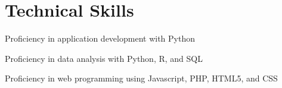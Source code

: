 \documentclass[letterpaper]{article}
\renewenvironment{itemize}{
  \begin{list}{}{
    \setlength{\leftmargin}{1.5em}
  }
}{
  \end{list}
}
\begin{document}
\section*{Technical Skills}

\begin{itemize}
    \item Proficiency in application development with Python
    \item Proficiency in data analysis with Python, R, and SQL
    \item Proficiency in web programming using Javascript, PHP, HTML5, and CSS
\end{itemize}
\end{document}

